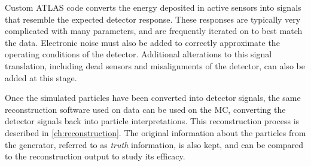 Custom ATLAS code converts the energy deposited in active sensors into signals that resemble the expected detector response. These responses are typically very complicated with many parameters, and are frequently iterated on to best match the data. Electronic noise must also be added to correctly approximate the operating conditions of the detector. Additional alterations to this signal translation, including dead sensors and misalignments of the detector, can also be added at this stage. 

Once the simulated particles have been converted into detector signals, the same reconstruction software used on data can be used on the \ac{MC}, converting the detector signals back into particle interpretations. This reconstruction process is described in \autoref{ch:reconstruction}. The original information about the particles from the generator, referred to as \textit{truth} information, is also kept, and can be compared to the reconstruction output to study its efficacy.






